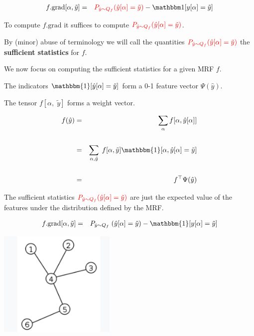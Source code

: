 {

\begin{eqnarray*}
    f.\mathrm{grad}[\alpha,\tilde{y}]
    & = &  {\color{red} P_{\hat{y} \sim Q_f}(\hat{y}[\alpha] = \tilde{y})} - \bbone[y[\alpha] = \tilde{y}] \\
\end{eqnarray*}

\vfill
To compute $f.\mathrm{grad}$ it suffices to compute ${\color{red} P_{\hat{y} \sim Q_f}(\hat{y}[\alpha] = \tilde{y})}$.

\vfill
By (minor) abuse of terminology we will call the quantities ${\color{red} P_{\hat{y} \sim Q_f}(\hat{y}[\alpha] = \tilde{y})}$ the {\bf sufficient statistics}
for $f$.

\vfill
We now focus on computing the sufficient statistics for a given MRF $f$.


The indicators $\mathbbm{1}[\hat{y}[\alpha] = \tilde{y}]$ form a 0-1 feature vector $\Psi(\hat{y})$.

\vfill
The tensor $f[\alpha,\;\tilde{y}]$ forms a weight vector.

\begin{eqnarray*}
f(\hat{y}) & = & \sum_\alpha f[\alpha,\hat{y}[\alpha]] \\
\\
& = & \sum_{\alpha,\tilde{y}}\;f[\alpha,\tilde{y}] \mathbbm{1}[\alpha, \hat{y}[\alpha] = \tilde{y}] \\
\\
& = & f^\top \Psi(\hat{y})
\end{eqnarray*}


The sufficient statistics  ${\color{red} P_{\hat{y} \sim Q_f}(\hat{y}[\alpha] = \tilde{y})}$ are just the expected value of the features under the distribution
defined by the MRF.


\begin{eqnarray*}
  f.\mathrm{grad}[\alpha,\tilde{y}] & = & P_{\hat{y} \sim Q_f}\;(\hat{y}[\alpha] = \tilde{y}) - \mathbbm{1}[y[\alpha] = \tilde{y}]
\end{eqnarray*}

\vfill
\centerline{\includegraphics[height= 2in]{../images/Tree}}

}
